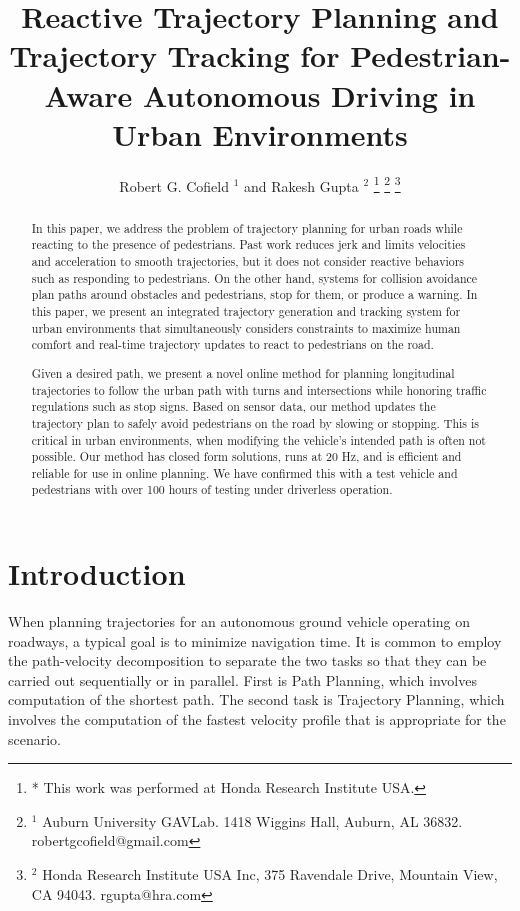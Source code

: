 \documentclass[letterpaper, 10 pt, conference]{ieeeconf}  %
\title{\LARGE \bf
  Reactive Trajectory Planning and Trajectory Tracking for Pedestrian-Aware Autonomous Driving in Urban Environments
}
\author{
  Robert G. Cofield $^{1}$ and
  Rakesh Gupta $^{2}$
  \thanks{
    * This work was performed at Honda Research Institute USA.
  }
  \thanks{
    $^{1}$ Auburn University GAVLab. 1418 Wiggins Hall, Auburn, AL 36832. robertgcofield@gmail.com
  }
  \thanks{
    $^{2}$ Honda Research Institute USA Inc, 375 Ravendale Drive, Mountain View, CA 94043. rgupta@hra.com
  }
}
\begin{document}
\maketitle
\thispagestyle{empty}
\pagestyle{empty}

\begin{abstract}

In this paper, we address the problem of trajectory planning for urban roads while reacting to the presence of pedestrians.
Past work reduces jerk and limits velocities and acceleration to smooth trajectories, but it does not consider reactive behaviors such as responding to pedestrians.
On the other hand, systems for collision avoidance plan paths around obstacles and pedestrians, stop for them, or produce a warning. 
In this paper, we present an integrated trajectory generation and tracking system for urban environments that simultaneously considers constraints to maximize human comfort and real-time trajectory updates to react to pedestrians on the road. 

Given a desired path, we present a novel online method for planning longitudinal trajectories to follow the urban path with turns and intersections while honoring traffic regulations such as stop signs.
Based on sensor data, our method updates the trajectory plan to safely avoid pedestrians on the road by slowing or stopping.
This is critical in urban environments, when modifying the vehicle's intended path is often not possible.
Our method has closed form solutions, runs at 20 Hz, and is efficient and reliable for use in online planning.
We have confirmed this with a test vehicle and pedestrians with over 100 hours of testing under driverless operation.

\end{abstract}

\section{Introduction} \label{sec:introduction}

When planning trajectories for an autonomous ground vehicle operating on roadways, a typical goal is to minimize navigation time.
It is common to employ the path-velocity decomposition to separate the two tasks so that they can be carried out sequentially or in parallel.
First is Path Planning, which involves computation of the shortest path.
The second task is Trajectory Planning, which involves the computation of the fastest velocity profile that is appropriate for the scenario.
\end{document}
